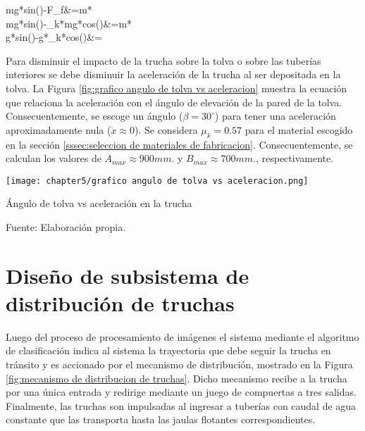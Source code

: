 \begin{myequation}\label{eq:calculo de angulo de la tolva2}
	\begin{split}
		mg*sin(\beta)-F_{f}&=m* \\
		mg*sin(\beta)-\mu_{k}*mg*cos(\beta)&=m* \\
		g*sin(\beta)-g*\mu_{k}*cos(\beta)&=
	\end{split}
\end{myequation}

Para disminuir el impacto de la trucha sobre la tolva o sobre las tuberías interiores se debe disminuir la aceleración de la trucha al ser depositada en la tolva. La Figura \ref{fig:grafico angulo de tolva vs aceleracion} muestra la ecuación que relaciona la aceleración con el ángulo de elevación de la pared de la tolva. Consecuentemente, se escoge un ángulo ($\beta=30^\circ$) para tener una aceleración aproximadamente nula ($\ddot{x}\approx0$). Se considera $\mu_{k}=0.57$ para el material escogido en la sección \ref{sssec:seleccion de materiales de fabricacion}. Consecuentemente, se calculan los valores de $A_{max}\approx{900} mm.$ y $B_{max}\approx{700} mm.$, respectivamente.


\begin{myfigure}[H]
	\footnotesize\centering
	\texttt{[image: chapter5/grafico angulo de tolva vs aceleracion.png]}
	\caption{Ángulo de tolva vs aceleración en la trucha}
	\begin{myflushcenter}
		Fuente: Elaboración propia.
	\end{myflushcenter}
	\label{fig:grafico angulo de tolva vs aceleracion}
\end{myfigure}

\section{Diseño de subsistema de distribución de truchas}

Luego del proceso de procesamiento de imágenes el sistema mediante el algoritmo de clasificación indica al sistema la trayectoria que debe seguir la trucha en tránsito y es accionado por el mecanismo de distribución, mostrado en la Figura \ref{fig:mecanismo de distribucion de truchas}. Dicho mecanismo recibe a la trucha por una única entrada y redirige mediante un juego de compuertas a tres salidas. Finalmente, las truchas son impulsadas al ingresar a tuberías con caudal de agua constante que las transporta hasta las jaulas flotantes correspondientes.

